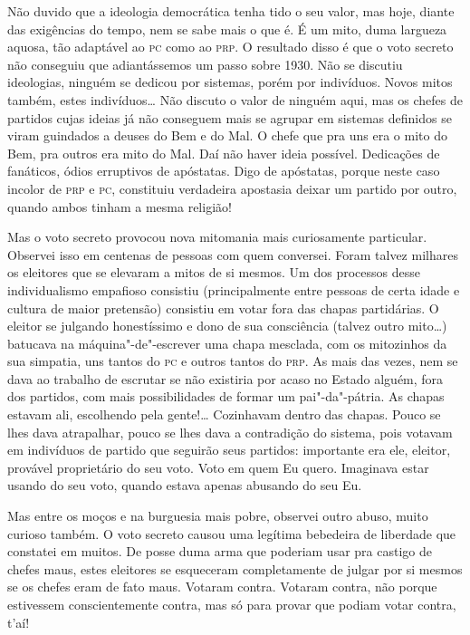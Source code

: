 Não duvido que a ideologia democrática tenha tido o seu valor, mas hoje,
diante das exigências do tempo, nem se sabe mais o que é. É um mito,
duma largueza aquosa, tão adaptável ao \textsc{pc} como ao \textsc{prp}. O resultado disso
é que o voto secreto não conseguiu que adiantássemos um passo sobre
1930. Não se discutiu ideologias, ninguém se dedicou por sistemas, porém
por indivíduos. Novos mitos também, estes indivíduos\ldots{} Não discuto o
valor de ninguém aqui, mas os chefes de partidos cujas ideias já não
conseguem mais se agrupar em sistemas definidos se viram guindados a
deuses do Bem e do Mal. O chefe que pra uns era o mito do Bem, pra
outros era mito do Mal. Daí não haver ideia possível. Dedicações de
fanáticos, ódios erruptivos de apóstatas. Digo de apóstatas, porque
neste caso incolor de \textsc{prp} e \textsc{pc}, constituiu verdadeira apostasia deixar
um partido por outro, quando ambos tinham a mesma religião!

Mas o voto secreto provocou nova mitomania mais curiosamente particular.
Observei isso em centenas de pessoas com quem conversei. Foram talvez
milhares os eleitores que se elevaram a mitos de si mesmos. Um dos
processos desse individualismo empafioso consistiu (principalmente entre
pessoas de certa idade e cultura de maior pretensão) consistiu em votar
fora das chapas partidárias. O eleitor se julgando honestíssimo e dono
de sua consciência (talvez outro mito\ldots{}) batucava na
máquina"-de"-escrever uma chapa mesclada, com os mitozinhos da sua
simpatia, uns tantos do \textsc{pc} e outros tantos do \textsc{prp}. As mais das vezes,
nem se dava ao trabalho de escrutar se não existiria por acaso no Estado
alguém, fora dos partidos, com mais possibilidades de formar um
pai"-da"-pátria. As chapas estavam ali, escolhendo pela gente!\ldots{}
Cozinhavam dentro das chapas. Pouco se lhes dava atrapalhar, pouco se
lhes dava a contradição do sistema, pois votavam em indivíduos de
partido que seguirão seus partidos: importante era ele, eleitor,
provável proprietário do seu voto. Voto em quem Eu quero. Imaginava
estar usando do seu voto, quando estava apenas abusando do seu Eu.

Mas entre os moços e na burguesia mais pobre, observei outro abuso,
muito curioso também. O voto secreto causou uma legítima bebedeira de
liberdade que constatei em muitos. De posse duma arma que poderiam usar
pra castigo de chefes maus, estes eleitores se esqueceram completamente
de julgar por si mesmos se os chefes eram de fato maus. Votaram contra.
Votaram contra, não porque estivessem conscientemente contra, mas só
para provar que podiam votar contra, t'aí!

